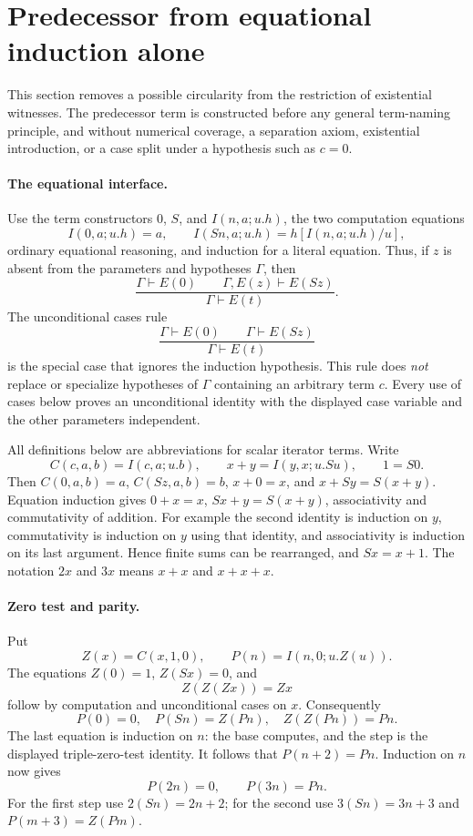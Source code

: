 \documentclass[11pt]{article}
\begin{document}
\appendix

\section{Predecessor from equational induction alone}
\label{sec:eq-predecessor}

This section removes a possible circularity from the restriction of existential
witnesses. The predecessor term is constructed before any general term-naming
principle, and without numerical coverage, a separation axiom, existential
introduction, or a case split under a hypothesis such as $c=0$.

\paragraph{The equational interface.}
Use the term constructors $0$, $S$, and
$I(n,a;u.h)$, the two computation equations
\[
 I(0,a;u.h)=a,\qquad
 I(Sn,a;u.h)=h[I(n,a;u.h)/u],
\]
ordinary equational reasoning, and induction for a literal equation. Thus,
if $z$ is absent from the parameters and hypotheses $\Gamma$, then
\[
 \frac{\Gamma\vdash E(0)\qquad
       \Gamma,E(z)\vdash E(Sz)}{\Gamma\vdash E(t)}.
\]
The unconditional cases rule
\[
 \frac{\Gamma\vdash E(0)\qquad\Gamma\vdash E(Sz)}
      {\Gamma\vdash E(t)}
\]
is the special case that ignores the induction hypothesis. This rule does
\emph{not} replace or specialize hypotheses of $\Gamma$ containing an
arbitrary term $c$. Every use of cases below proves an unconditional identity
with the displayed case variable and the other parameters independent.

All definitions below are abbreviations for scalar iterator terms. Write
\[
 C(c,a,b)=I(c,a;u.b),\qquad
 x+y=I(y,x;u.Su),\qquad 1=S0.
\]
Then $C(0,a,b)=a$, $C(Sz,a,b)=b$,
$x+0=x$, and $x+Sy=S(x+y)$. Equation induction gives
$0+x=x$, $Sx+y=S(x+y)$, associativity and commutativity of addition.
For example the second identity is induction on $y$, commutativity is
induction on $y$ using that identity, and associativity is induction on its
last argument. Hence finite sums can be rearranged, and $Sx=x+1$.
The notation $2x$ and $3x$ means $x+x$ and $x+x+x$.

\paragraph{Zero test and parity.}
Put
\[
 Z(x)=C(x,1,0),\qquad P(n)=I(n,0;u.Z(u)).
\]
The equations $Z(0)=1$, $Z(Sx)=0$, and
\[
 Z(Z(Zx))=Zx
\]
follow by computation and unconditional cases on $x$. Consequently
\[
 P(0)=0,\quad P(Sn)=Z(Pn),\quad Z(Z(Pn))=Pn.
\]
The last equation is induction on $n$: the base computes, and the step
is the displayed triple-zero-test identity. It follows that
$P(n+2)=Pn$. Induction on $n$ now gives
\[
 P(2n)=0,\qquad P(3n)=Pn.
\]
For the first step use $2(Sn)=2n+2$; for the second use
$3(Sn)=3n+3$ and $P(m+3)=Z(Pm)$.
\end{document}
